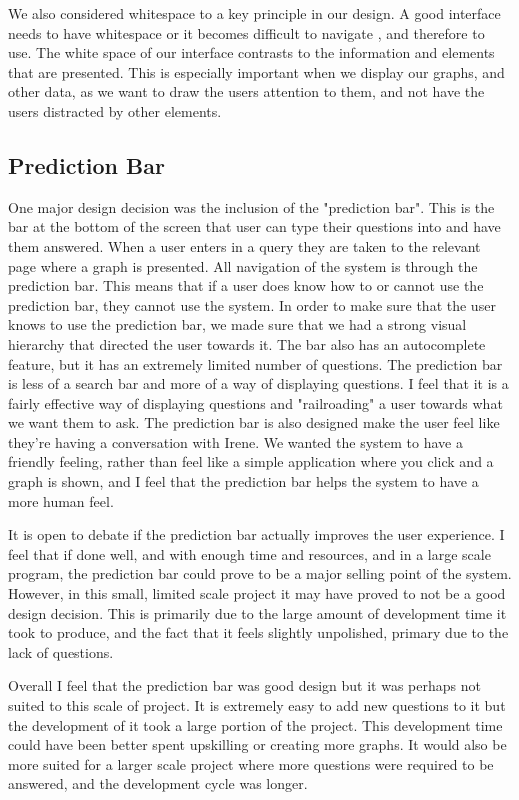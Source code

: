 \documentclass[10pt, journal]{IEEEtran}
\begin{document}
We also considered whitespace to a key principle in our design. A good interface needs to have whitespace or it becomes difficult to navigate \cite{whitespace}, and therefore to use. The white space of our interface contrasts to the information and elements that are presented. This is especially important when we display our graphs, and other data, as we want to draw the users attention to them, and not have the users distracted by other elements.


\subsection{Prediction Bar}

One major design decision was the inclusion of the "prediction bar". This is the bar at the bottom of the screen that user can type their questions into and have them answered. When a user enters in a query they are taken to the relevant page where a graph is presented. All navigation of the system is through the prediction bar. This means that if a user does know how to or cannot use the prediction bar, they cannot use the system. In order to make sure that the user knows to use the prediction bar, we made sure that we had a strong visual hierarchy that directed the user towards it. The bar also has an autocomplete feature, but it has an extremely limited number of questions. The prediction bar is less of a search bar and more of a way of displaying questions. I feel that it is a fairly effective way of displaying questions and "railroading" a user towards what we want them to ask. The prediction bar is also designed make the user feel like they're having a conversation with Irene. We wanted the system to have a friendly feeling, rather than feel like a simple application where you click and a graph is shown, and I feel that the prediction bar helps the system to have a more human feel.

It is open to debate if the prediction bar actually improves the user experience. I feel that if done well, and with enough time and resources, and in a large scale program, the prediction bar could prove to be a major selling point of the system. However, in this small, limited scale project it may have proved to not be a good design decision. This is primarily due to the large amount of development time it took to produce, and the fact that it feels slightly unpolished, primary due to the lack of questions. 

Overall I feel that the prediction bar was good design but it was perhaps not suited to this scale of project. It is extremely easy to add new questions to it but the development of it took a large portion of the project. This development time could have been better spent upskilling or creating more graphs. It would also be more suited for a larger scale project where more questions were required to be answered, and the development cycle was longer.
\end{document}
